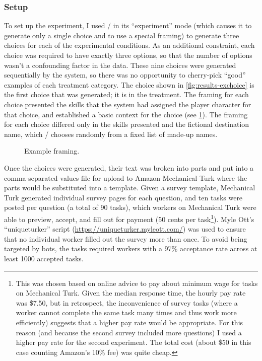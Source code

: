 \subsubsection{Setup}

To set up the experiment, I used \dunyazad/ in its ``experiment'' mode (which causes it to generate only a single choice and to use a special framing) to generate three choices for each of the experimental conditions.
%
As an additional constraint, each choice was required to have exactly three options, so that the number of options wasn't a confounding factor in the data.
%
These nine choices were generated sequentially by the system, so there was no opportunity to cherry-pick ``good'' examples of each treatment category.
%
The choice shown in \cref{fig:results-exchoice} is the first choice that was generated; it is in the \dlm{} treatment.
%
The framing for each choice presented the skills that the system had assigned the player character for that choice, and established a basic context for the choice (see \cref{fig:exframing}).
%
The framing for each choice differed only in the skills presented and the fictional destination name, which \dunyazad/ chooses randomly from a fixed list of made-up names.


\begin{figure}[!h]
  \caption{Example framing.}
  \label{fig:exframing}
\end{figure}


Once the choices were generated, their text was broken into parts and put into a comma-separated values file for upload to Amazon Mechanical Turk where the parts would be substituted into a template.
%
Given a survey template, Mechanical Turk generated individual survey pages for each question, and ten tasks were posted per question (a total of 90 tasks), which workers on Mechanical Turk were able to preview, accept, and fill out for payment (50 cents per task\footnote{This was chosen based on online advice to pay about minimum wage for tasks on Mechanical Turk. Given the median response time, the hourly pay rate was \$7.50, but in retrospect, the inconvenience of survey tasks (where a worker cannot complete the same task many times and thus work more efficiently) suggests that a higher pay rate would be appropriate. For this reason (and because the second survey included more questions) I used a higher pay rate for the second experiment. The total cost (about \$50 in this case counting Amazon's 10\% fee) was quite cheap.}).
%
Myle Ott's ``uniqueturker'' script (\url{https://uniqueturker.myleott.com/}) was used to ensure that no individual worker filled out the survey more than once.
%
To avoid being targeted by bots, the tasks required workers with a 97\% acceptance rate across at least 1000 accepted tasks.

